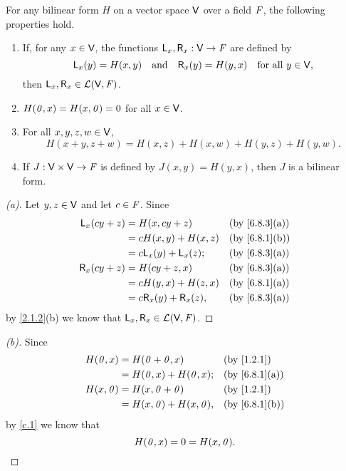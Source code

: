 \begin{prop}\label{6.8.3}
  For any bilinear form \(H\) on a vector space \(\mathsf{V}\) over a field \(\mathit{F}\), the following properties hold.
  \begin{enumerate}
    \item If, for any \(x \in \mathsf{V}\), the functions \(\mathsf{L}_x, \mathsf{R}_x : \mathsf{V} \to \mathit{F}\) are defined by
          \[
            \mathsf{L}_x(y) = H(x, y) \quad \text{and} \quad \mathsf{R}_x(y) = H(y, x) \quad \text{for all } y \in \mathsf{V},
          \]
          then \(\mathsf{L}_x, \mathsf{R}_x \in \mathcal{L}(\mathsf{V}, \mathit{F})\).
    \item \(H(\mathit{0}, x) = H(x, \mathit{0}) = 0\) for all \(x \in \mathsf{V}\).
    \item For all \(x, y, z, w \in \mathsf{V}\),
          \[
            H(x + y, z + w) = H(x, z) + H(x, w) + H(y, z) + H(y, w).
          \]
    \item If \(J : \mathsf{V} \times \mathsf{V} \to \mathit{F}\) is defined by \(J(x, y) = H(y, x)\), then \(J\) is a bilinear form.
  \end{enumerate}
\end{prop}

\begin{proof}[(a)]
  Let \(y, z \in \mathsf{V}\) and let \(c \in \mathit{F}\).
  Since
  \begin{align*}
    \lt{L}_x(cy + z) & = H(x, cy + z)                 &  & \by{6.8.3}[a] \\
                     & = c H(x, y) + H(x, z)          &  & \by{6.8.1}[b] \\
                     & = c \lt{L}_x(y) + \lt{L}_x(z); &  & \by{6.8.3}[a] \\
    \lt{R}_x(cy + z) & = H(cy + z, x)                 &  & \by{6.8.3}[a] \\
                     & = c H(y, x) + H(z, x)          &  & \by{6.8.1}[a] \\
                     & = c \lt{R}_x(y) + \lt{R}_x(z), &  & \by{6.8.3}[a]
  \end{align*}
  by \cref{2.1.2}(b) we know that \(\mathsf{L}_x, \mathsf{R}_x \in \mathcal{L}(\mathsf{V}, \mathit{F})\).
\end{proof}

\begin{proof}[(b)]
  Since
  \begin{align*}
    H(\zv, x) & = H(\zv + \zv, x)        &  & \by{1.2.1}    \\
              & = H(\zv, x) + H(\zv, x); &  & \by{6.8.1}[a] \\
    H(x, \zv) & = H(x, \zv + \zv)        &  & \by{1.2.1}    \\
              & = H(x, \zv) + H(x, \zv), &  & \by{6.8.1}[b]
  \end{align*}
  by \cref{c.1} we know that
  \[
    H(\mathit{0}, x) = 0 = H(x, \mathit{0}).
  \]
\end{proof}

